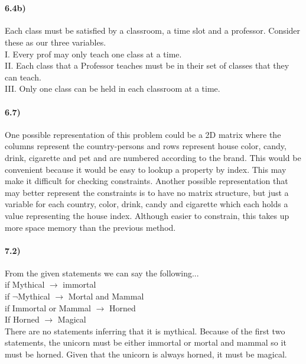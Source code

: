 \documentclass[12pt]{article}
\begin{document}
\maketitle\

\paragraph{6.4b)}
Each class must be satisfied by a classroom, a time slot and a professor.
Consider these as our three variables.\\
I. Every prof may only teach one class at a time. \\
II. Each class that a Professor teaches must be in their set of classes that they can teach.\\
III. Only one class can be held in each classroom at a time.
\paragraph{6.7)}
One possible representation of this problem could be a 2D matrix where the columns represent the country-persons and rows represent house color, candy, drink, cigarette and pet and are numbered according to the brand. This would be convenient because it would be easy to lookup a property by index. This may make it difficult for checking constraints. Another possible representation that may better represent the constraints is to have no matrix structure, but just a variable for each country, color, drink, candy and cigarette which each holds a value representing the house index. Although easier to constrain, this takes up more space memory than the previous method.
\paragraph{7.2)}From the given statements we can say the following... \\
if Mythical $\rightarrow$ immortal \\
if $\neg$Mythical $\rightarrow$ Mortal and Mammal\\
if Immortal or Mammal $\rightarrow$ Horned \\
If Horned $\rightarrow$ Magical\\
There are no statements inferring that it is mythical.
Because of the first two statements, the unicorn must be either immortal or mortal and mammal so it must be horned. Given that the unicorn is always horned, it must be magical. \\
\end{document}
